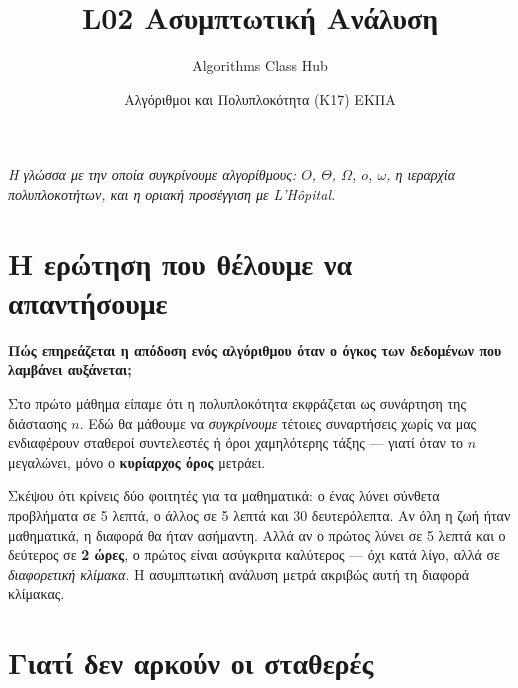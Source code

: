 \documentclass[11pt,a4paper]{article}
\title{\textbf{L02 \textperiodcentered{} Ασυμπτωτική Ανάλυση}}
\author{Algorithms Class Hub}
\date{\small Αλγόριθμοι και Πολυπλοκότητα (K17) \textperiodcentered{} ΕΚΠΑ}
\begin{document}
\maketitle

\begin{center}\itshape\small
Η γλώσσα με την οποία συγκρίνουμε αλγορίθμους: $O$, $\Theta$, $\Omega$, $o$,
$\omega$, η ιεραρχία πολυπλοκοτήτων, και η οριακή προσέγγιση με L'Hôpital.
\end{center}

\section{Η ερώτηση που θέλουμε να απαντήσουμε}

\begin{quoteblock}
\textbf{Πώς επηρεάζεται η απόδοση ενός αλγόριθμου όταν ο όγκος των δεδομένων που
λαμβάνει αυξάνεται;}
\end{quoteblock}

Στο πρώτο μάθημα είπαμε ότι η πολυπλοκότητα εκφράζεται ως συνάρτηση της διάστασης
$n$. Εδώ θα μάθουμε να \textit{συγκρίνουμε} τέτοιες συναρτήσεις χωρίς να μας
ενδιαφέρουν σταθεροί συντελεστές ή όροι χαμηλότερης τάξης --- γιατί όταν το $n$
μεγαλώνει, μόνο ο \textbf{κυρίαρχος όρος} μετράει.

\begin{intuition}
Σκέψου ότι κρίνεις δύο φοιτητές για τα μαθηματικά: ο ένας λύνει σύνθετα
προβλήματα σε 5 λεπτά, ο άλλος σε 5 λεπτά και 30 δευτερόλεπτα. Αν όλη η ζωή ήταν
μαθηματικά, η διαφορά θα ήταν ασήμαντη. Αλλά αν ο πρώτος λύνει σε 5 λεπτά και ο
δεύτερος σε \textbf{2 ώρες}, ο πρώτος είναι ασύγκριτα καλύτερος --- όχι κατά λίγο,
αλλά σε \textit{διαφορετική κλίμακα}. Η ασυμπτωτική ανάλυση μετρά ακριβώς αυτή τη
διαφορά κλίμακας.
\end{intuition}

\section{Γιατί δεν αρκούν οι σταθερές}
\end{document}
